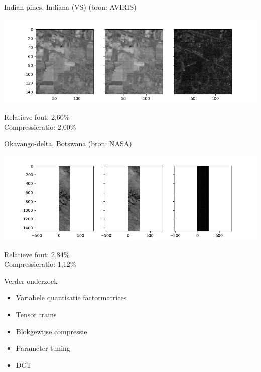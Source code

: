 \documentclass[t,12pt,dutch
\ifx\beamermode\undefined\else,\beamermode\fi
]{beamer}
\begin{document}
\begin{frame}{Indian pines, Indiana (VS) (bron: AVIRIS)}

\begin{center}
\includegraphics[scale=0.5]{images/indian_pines_0-025.png}
\end{center}

Relatieve fout: 2,60\%\\
Compressieratio: 2,00\%

\end{frame}

\begin{frame}{Okavango-delta, Botswana (bron: NASA)}

\begin{center}
\includegraphics[scale=0.5]{images/botswana_0-025.png}
\end{center}

Relatieve fout: 2,84\%\\
Compressieratio: 1,12\%

\end{frame}

\begin{frame}{Verder onderzoek}

\begin{itemize}
\item Variabele quantisatie factormatrices
\item Tensor trains
\item Blokgewijse compressie
\item Parameter tuning
\item DCT
\end{itemize}

\end{frame}
\end{document}
